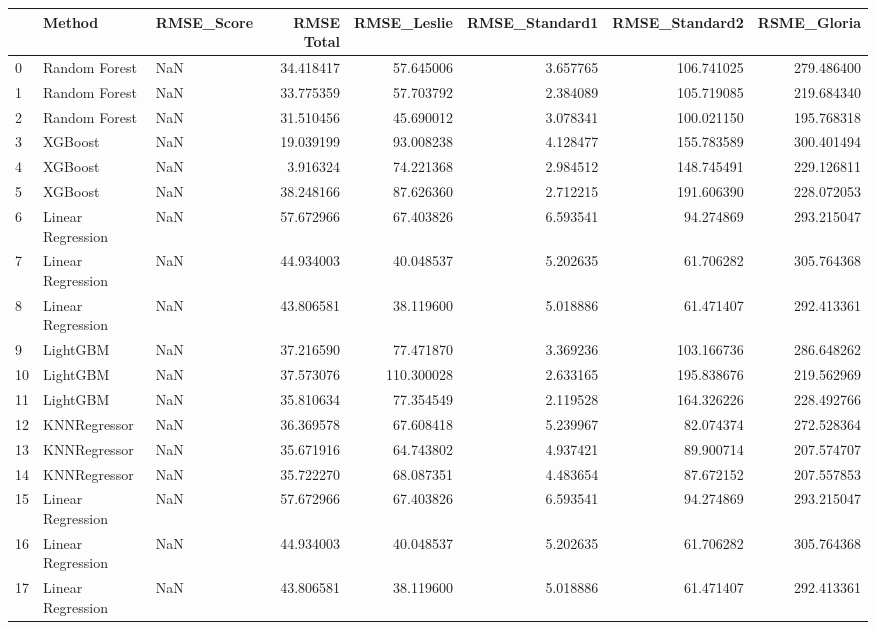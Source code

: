 \begin{tabular}{lllrrrrr}
\toprule
{} &             Method & RMSE\_Score &  RMSE Total &  RMSE\_Leslie &  RMSE\_Standard1 &  RMSE\_Standard2 &  RSME\_Gloria \\
\midrule
0  &      Random Forest &        NaN &   34.418417 &    57.645006 &        3.657765 &      106.741025 &   279.486400 \\
1  &      Random Forest &        NaN &   33.775359 &    57.703792 &        2.384089 &      105.719085 &   219.684340 \\
2  &      Random Forest &        NaN &   31.510456 &    45.690012 &        3.078341 &      100.021150 &   195.768318 \\
3  &            XGBoost &        NaN &   19.039199 &    93.008238 &        4.128477 &      155.783589 &   300.401494 \\
4  &            XGBoost &        NaN &    3.916324 &    74.221368 &        2.984512 &      148.745491 &   229.126811 \\
5  &            XGBoost &        NaN &   38.248166 &    87.626360 &        2.712215 &      191.606390 &   228.072053 \\
6  &  Linear Regression &        NaN &   57.672966 &    67.403826 &        6.593541 &       94.274869 &   293.215047 \\
7  &  Linear Regression &        NaN &   44.934003 &    40.048537 &        5.202635 &       61.706282 &   305.764368 \\
8  &  Linear Regression &        NaN &   43.806581 &    38.119600 &        5.018886 &       61.471407 &   292.413361 \\
9  &           LightGBM &        NaN &   37.216590 &    77.471870 &        3.369236 &      103.166736 &   286.648262 \\
10 &           LightGBM &        NaN &   37.573076 &   110.300028 &        2.633165 &      195.838676 &   219.562969 \\
11 &           LightGBM &        NaN &   35.810634 &    77.354549 &        2.119528 &      164.326226 &   228.492766 \\
12 &       KNNRegressor &        NaN &   36.369578 &    67.608418 &        5.239967 &       82.074374 &   272.528364 \\
13 &       KNNRegressor &        NaN &   35.671916 &    64.743802 &        4.937421 &       89.900714 &   207.574707 \\
14 &       KNNRegressor &        NaN &   35.722270 &    68.087351 &        4.483654 &       87.672152 &   207.557853 \\
15 &  Linear Regression &        NaN &   57.672966 &    67.403826 &        6.593541 &       94.274869 &   293.215047 \\
16 &  Linear Regression &        NaN &   44.934003 &    40.048537 &        5.202635 &       61.706282 &   305.764368 \\
17 &  Linear Regression &        NaN &   43.806581 &    38.119600 &        5.018886 &       61.471407 &   292.413361 \\
\bottomrule
\end{tabular}
